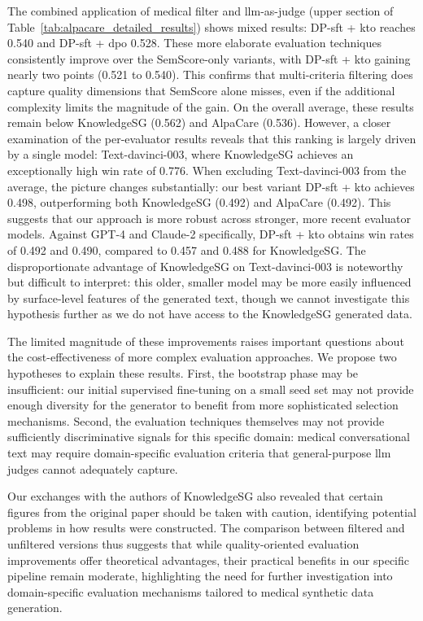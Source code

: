 The combined application of medical filter and \gls{llm}-as-judge (upper section of Table~\ref{tab:alpacare_detailed_results}) shows mixed results: DP-\gls{sft} + \gls{kto} reaches \num{0.540} and DP-\gls{sft} + \gls{dpo} \num{0.528}.
These more elaborate evaluation techniques consistently improve over the SemScore-only variants, with DP-\gls{sft} + \gls{kto} gaining nearly two points (\num{0.521} to \num{0.540}).
This confirms that multi-criteria filtering does capture quality dimensions that SemScore alone misses, even if the additional complexity limits the magnitude of the gain.
On the overall average, these results remain below KnowledgeSG (\num{0.562}) and AlpaCare (\num{0.536}).
However, a closer examination of the per-evaluator results reveals that this ranking is largely driven by a single model: Text-davinci-003, where KnowledgeSG achieves an exceptionally high win rate of \num{0.776}.
When excluding Text-davinci-003 from the average, the picture changes substantially: our best variant DP-\gls{sft} + \gls{kto} achieves \num{0.498}, outperforming both KnowledgeSG (\num{0.492}) and AlpaCare (\num{0.492}).
This suggests that our approach is more robust across stronger, more recent evaluator models.
Against GPT-4 and Claude-2 specifically, DP-\gls{sft} + \gls{kto} obtains win rates of \num{0.492} and \num{0.490}, compared to \num{0.457} and \num{0.488} for KnowledgeSG.
The disproportionate advantage of KnowledgeSG on Text-davinci-003 is noteworthy but difficult to interpret: this older, smaller model may be more easily influenced by surface-level features of the generated text, though we cannot investigate this hypothesis further as we do not have access to the KnowledgeSG generated data.

The limited magnitude of these improvements raises important questions about the cost-effectiveness of more complex evaluation approaches. We propose two hypotheses to explain these results. First, the bootstrap phase may be insufficient: our initial supervised fine-tuning on a small seed set may not provide enough diversity for the generator to benefit from more sophisticated selection mechanisms. Second, the evaluation techniques themselves may not provide sufficiently discriminative signals for this specific domain: medical conversational text may require domain-specific evaluation criteria that general-purpose \gls{llm} judges cannot adequately capture.

Our exchanges with the authors of KnowledgeSG also revealed that certain figures from the original paper should be taken with caution, identifying potential problems in how results were constructed. The comparison between filtered and unfiltered versions thus suggests that while quality-oriented evaluation improvements offer theoretical advantages, their practical benefits in our specific pipeline remain moderate, highlighting the need for further investigation into domain-specific evaluation mechanisms tailored to medical synthetic data generation.


